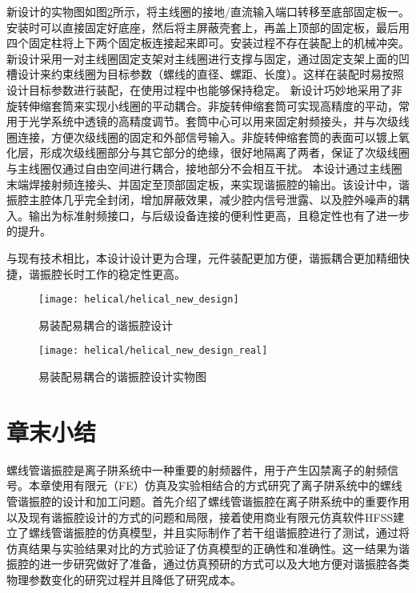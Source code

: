 新设计的实物图如图\ref{fig:helical_new_design_real}所示，将主线圈的接地/直流输入端口转移至底部固定板一。安装时可以直接固定好底座，然后将主屏蔽壳套上，再盖上顶部的固定板，最后用四个固定柱将上下两个固定板连接起来即可。安装过程不存在装配上的机械冲突。
新设计采用一对主线圈固定支架对主线圈进行支撑与固定，通过固定支架上面的凹槽设计来约束线圈为目标参数（螺线的直径、螺距、长度）。这样在装配时易按照设计目标参数进行装配，在使用过程中也能够保持稳定。
新设计巧妙地采用了非旋转伸缩套筒来实现小线圈的平动耦合。非旋转伸缩套筒可实现高精度的平动，常用于光学系统中透镜的高精度调节。套筒中心可以用来固定射频接头，并与次级线圈连接，方便次级线圈的固定和外部信号输入。非旋转伸缩套筒的表面可以镀上氧化层，形成次级线圈部分与其它部分的绝缘，很好地隔离了两者，保证了次级线圈与主线圈仅通过自由空间进行耦合，接地部分不会相互干扰。
本设计通过主线圈末端焊接射频连接头、并固定至顶部固定板，来实现谐振腔的输出。该设计中，谐振腔主腔体几乎完全封闭，增加屏蔽效果，减少腔内信号泄露、以及腔外噪声的耦入。输出为标准射频接口，与后级设备连接的便利性更高，且稳定性也有了进一步的提升。

与现有技术相比，本设计设计更为合理，元件装配更加方便，谐振耦合更加精细快捷，谐振腔长时工作的稳定性更高。
\begin{figure}
    \centering
    \caption[易装配易耦合的谐振腔设计]{易装配易耦合的谐振腔设计\label{fig:helical_new_design}}
    \texttt{[image: helical/helical\_new\_design]}
\end{figure}

\begin{figure}
    \centering
    \caption[易装配易耦合的谐振腔设计实物图]{易装配易耦合的谐振腔设计实物图\label{fig:helical_new_design_real}}
    \texttt{[image: helical/helical\_new\_design\_real]}
\end{figure}







\newpage
\section[章末小结]{章末小结}
螺线管谐振腔是离子阱系统中一种重要的射频器件，用于产生囚禁离子的射频信号。本章使用有限元（FE）仿真及实验相结合的方式研究了离子阱系统中的螺线管谐振腔的设计和加工问题。首先介绍了螺线管谐振腔在离子阱系统中的重要作用以及现有谐振腔设计的方式的问题和局限，接着使用商业有限元仿真软件HFSS建立了螺线管谐振腔的仿真模型，并且实际制作了若干组谐振腔进行了测试，通过将仿真结果与实验结果对比的方式验证了仿真模型的正确性和准确性。这一结果为谐振腔的进一步研究做好了准备，通过仿真预研的方式可以及大地方便对谐振腔各类物理参数变化的研究过程并且降低了研究成本。

